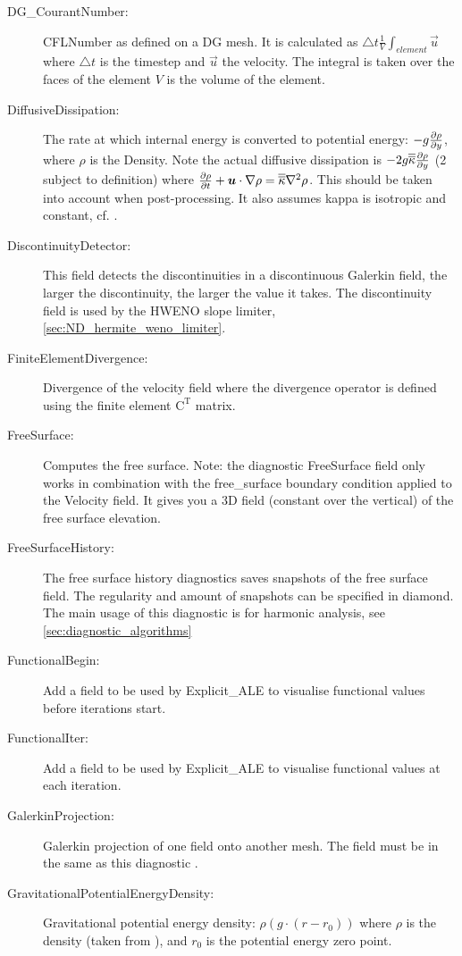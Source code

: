\begin{description}
\item[DG\_CourantNumber:]CFLNumber as defined on a DG mesh. It is calculated as $\triangle t \frac{1}{V} \int _{element} \vec{u}$ where $\triangle t$ is the timestep and $\vec{u}$ the velocity. The integral is taken over the faces of the element $V$ is the volume of the element.
\item[DiffusiveDissipation:]The rate at which internal energy is converted to potential energy: $-g\ppx[y]{\rho}$, where $\rho$ is the Density. Note the actual diffusive dissipation is $-2g\tensor{\kappa} \ppx[y]{\rho}$ (2 subject to definition) where $\ppt[t]{\rho} + \vec{u}\cdot \nabla \rho = \tensor{\kappa} \nabla^2 \rho$. This should be taken into account when post-processing. It also assumes kappa is isotropic and constant, cf. \cite{winters1995}.
\item[DiscontinuityDetector:]This field detects the discontinuities in a discontinuous Galerkin field, the larger the discontinuity, the larger the value it takes. The discontinuity field is used by the HWENO slope limiter, \ref{sec:ND_hermite_weno_limiter}.
\item[FiniteElementDivergence:]Divergence of the velocity field where the divergence operator is defined using the finite element $\mathrm{C}^\mathrm{T}$ matrix.
\item[FreeSurface:]Computes the free surface. Note: the diagnostic FreeSurface field only works in combination with the free\_surface boundary condition applied to the Velocity field. It gives you a 3D field (constant over the vertical) of the free surface elevation.
\item[FreeSurfaceHistory:]The free surface history diagnostics saves snapshots of the free surface field. The regularity and amount of snapshots can be specified in diamond. The main usage of this diagnostic is for harmonic analysis, see \ref{sec:diagnostic_algorithms}
\item[FunctionalBegin:]Add a field to be used by Explicit\_ALE to visualise functional values before iterations start.
\item[FunctionalIter:]Add a field to be used by Explicit\_ALE to visualise functional values at each iteration.
\item[GalerkinProjection:]Galerkin projection of one field onto another mesh. The field must be in the same  as this diagnostic .
\item[GravitationalPotentialEnergyDensity:]Gravitational potential energy density: $\rho(g \cdot (r - r_0))$ where $\rho$ is the density (taken from ), and $r_0$ is the potential energy zero point. \\

\end{description}
